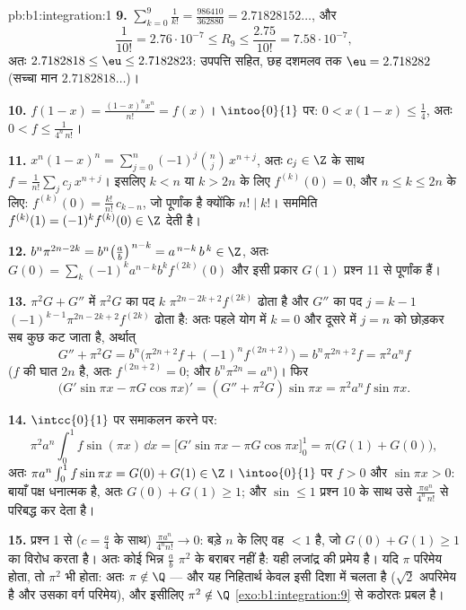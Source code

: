 \begin{solution}{pb:b1:integration:1}
\textbf{9.} $\sum_{k=0}^{9} \frac{1}{k!} = \frac{986410}{362880} =
2.71828152\dots$, और
\[
\frac{1}{10!} = 2.76\cdot10^{-7} \leq R_9 \leq
\frac{2.75}{10!} = 7.58\cdot10^{-7} ,
\]
अतः $2.7182818 \leq \eu \leq 2.7182823$: उपपत्ति सहित, छह दशमलव तक $\eu =
2.718282$ (सच्चा मान $2.7182818\dots$)।

\textbf{10.} $f(1 - x) = \frac{(1-x)^n x^n}{n!} = f(x)$। $\intoo{0}{1}$ पर:
$0 < x(1-x) \leq \frac14$, अतः $0 < f \leq \frac{1}{4^n\,n!}$।

\textbf{11.} $x^n(1-x)^n = \sum_{j=0}^{n} (-1)^j\binom nj\,x^{n+j}$, अतः
$c_j \in \Z$ के साथ $f = \frac{1}{n!}\sum_j c_j\,x^{n+j}$। इसलिए $k < n$ या
$k > 2n$ के लिए $f^{(k)}(0) = 0$, और $n \leq k \leq 2n$ के लिए: $f^{(k)}(0)
= \frac{k!}{n!}\, c_{k-n}$, जो पूर्णांक है क्योंकि $n! \mid k!$। सममिति
$f^{(k)}(1) = (-1)^k f^{(k)}(0) \in \Z$ देती है।

\textbf{12.} $b^n \pi^{2n-2k} = b^n\bigl(\frac ab\bigr)^{\,n-k} =
a^{\,n-k}\,b^{\,k} \in \Z$, अतः $G(0) = \sum_k (-1)^k a^{n-k} b^k
f^{(2k)}(0)$ और इसी प्रकार $G(1)$ प्रश्न 11 से पूर्णांक हैं।

\textbf{13.} $\pi^2 G + G''$ में $\pi^2 G$ का पद $k$ $\pi^{2n-2k+2}f^{(2k)}$
ढोता है और $G''$ का पद $j = k - 1$ $(-1)^{k-1}\pi^{2n-2k+2}f^{(2k)}$ ढोता
है: अतः पहले योग में $k = 0$ और दूसरे में $j = n$ को छोड़कर सब कुछ कट जाता
है, अर्थात्
\[
G'' + \pi^2 G = b^n\bigl(\pi^{2n+2} f + (-1)^n f^{(2n+2)}\bigr)
= b^n \pi^{2n+2} f = \pi^2 a^n f
\]
($f$ की घात $2n$ है, अतः $f^{(2n+2)} = 0$; और $b^n\pi^{2n} = a^n$)। फिर
\[
\bigl(G'\sin\pi x - \pi G\cos\pi x\bigr)'
= (G'' + \pi^2 G)\sin \pi x = \pi^2 a^n f\sin\pi x .
\]

\textbf{14.} $\intcc{0}{1}$ पर समाकलन करने पर:
\[
\pi^2 a^n \int_0^1 f\sin(\pi x)\,\dd x
= \bigl[G'\sin\pi x - \pi G\cos\pi x\bigr]_0^1
= \pi\bigl(G(1) + G(0)\bigr) ,
\]
अतः $\pi a^n \int_0^1 f\sin\pi x = G(0) + G(1) \in \Z$। $\intoo{0}{1}$ पर $f
> 0$ और $\sin\pi x > 0$: बायाँ पक्ष धनात्मक है, अतः $G(0) + G(1) \geq 1$; और
$\sin \leq 1$ प्रश्न 10 के साथ उसे $\frac{\pi a^n}{4^n\,n!}$ से परिबद्ध कर
देता है।

\textbf{15.} प्रश्न 1 से ($c = \frac a4$ के साथ) $\frac{\pi a^n}{4^n n!} \to
0$: बड़े $n$ के लिए वह $< 1$ है, जो $G(0) + G(1) \geq 1$ का विरोध करता है।
अतः कोई भिन्न $\frac ab$ $\pi^2$ के बराबर नहीं है: यही लजांद्र की प्रमेय है।
यदि $\pi$ परिमेय होता, तो $\pi^2$ भी होता: अतः $\pi \notin \Q$ --- और यह
निहितार्थ केवल इसी दिशा में चलता है ($\sqrt2$ अपरिमेय है और उसका वर्ग
परिमेय), और इसीलिए $\pi^2 \notin \Q$ \cref{exo:b1:integration:9} से कठोरतः
प्रबल है।


\end{solution}
